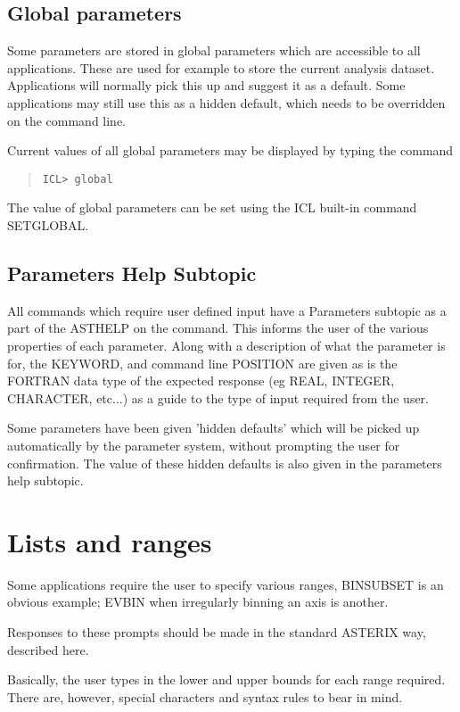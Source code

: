 \documentclass{book}
\renewcommand{\_}{{\tt\char'137}}     %
\begin{document}
\subsection{Global parameters}
Some parameters are stored in global parameters which are
accessible to all applications. These are used for example to
store the current analysis dataset. Applications will normally
pick this up and suggest it as a default. Some applications may
still use this as a hidden default, which needs to be overridden
on the command line.

Current values of all global parameters may be displayed by
typing the command

\begin{quote}\begin{verbatim}
ICL> global
\end{verbatim}\end{quote}
The value of global parameters can be set using the ICL built-in
command SETGLOBAL.

\subsection{Parameters Help Subtopic}
All commands which require user defined input have a Parameters
subtopic as a part of the ASTHELP on the command. This informs
the user of the various properties of each parameter. Along with
a description of what the parameter is for, the KEYWORD, and
command line POSITION are given as is the FORTRAN data type of
the expected response (eg REAL, INTEGER, CHARACTER, etc...) as a
guide to the type of input required from the user.

Some parameters have been given 'hidden defaults' which will be
picked up automatically by the parameter system, without
prompting the user for confirmation. The value of these hidden
defaults is also given in the parameters help subtopic.

\section{Lists and ranges}
Some applications require the user to specify various ranges,
BINSUBSET is an obvious example; EVBIN when irregularly binning
an axis is another.

Responses to these prompts should be made in the standard ASTERIX
way, described here.

Basically, the user types in the lower and upper bounds for each
range required. There are, however, special characters and syntax
rules to bear in mind.
\end{document}
